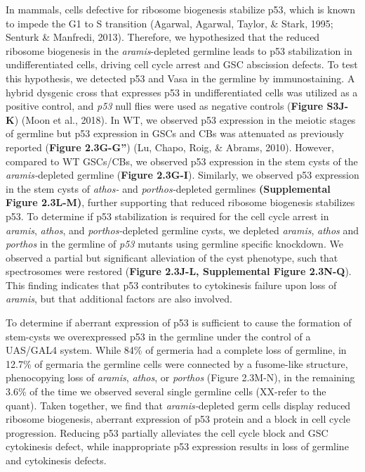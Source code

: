 \documentclass[12pt,twoside]{reedthesis}
\begin{document}
In mammals, cells defective for ribosome biogenesis stabilize p53, which
is known to impede the G1 to S transition (Agarwal, Agarwal, Taylor, \& Stark, 1995; Senturk \& Manfredi, 2013). Therefore, we hypothesized that the reduced
ribosome biogenesis in the \emph{aramis}-depleted germline leads to p53
stabilization in undifferentiated cells, driving cell cycle arrest and
GSC abscission defects. To test this hypothesis, we detected p53 and
Vasa in the germline by immunostaining. A hybrid dysgenic cross that
expresses p53 in undifferentiated cells was utilized as a positive
control, and \emph{p53} null flies were used as negative controls (\textbf{Figure
S3J-K}) (Moon et al., 2018). In WT, we observed p53 expression in the
meiotic stages of germline but p53 expression in GSCs and CBs was
attenuated as previously reported (\textbf{Figure 2.3G-G''})
(Lu, Chapo, Roig, \& Abrams, 2010). However, compared to WT
GSCs/CBs, we observed p53 expression in the stem cysts of the
\emph{aramis-}depleted germline (\textbf{Figure 2.3G-I}). Similarly, we observed p53
expression in the stem cysts of \emph{athos-} and \emph{porthos-}depleted
germlines \textbf{(Supplemental Figure 2.3L-M)}, further supporting that reduced ribosome
biogenesis stabilizes p53. To determine if p53 stabilization is required
for the cell cycle arrest in \emph{aramis}, \emph{athos}, and \emph{porthos-}depleted
germline cysts, we depleted \emph{aramis}, \emph{athos} and \emph{porthos} in the
germline of \emph{p53} mutants using germline specific knockdown. We observed
a partial but significant alleviation of the cyst phenotype, such that
spectrosomes were restored (\textbf{Figure 2.3J-L, Supplemental Figure 2.3N-Q}). This finding
indicates that p53 contributes to cytokinesis failure upon loss of
\emph{aramis}, but that additional factors are also involved.

To determine if aberrant expression of p53 is sufficient to cause the
formation of stem-cysts we overexpressed p53 in the germline under the
control of a UAS/GAL4 system. While 84\% of germeria had a complete loss
of germline, in 12.7\% of germaria the germline cells were connected by a
fusome-like structure, phenocopying loss of \emph{aramis}, \emph{athos}, or
\emph{porthos} (Figure 2.3M-N), in the remaining 3.6\% of the time we observed
several single germline cells (XX-refer to the quant). Taken together,
we find that \emph{aramis-}depleted germ cells display reduced ribosome
biogenesis, aberrant expression of p53 protein and a block in cell cycle
progression. Reducing p53 partially alleviates the cell cycle block and
GSC cytokinesis defect, while inappropriate p53 expression results in
loss of germline and cytokinesis defects.
\end{document}
